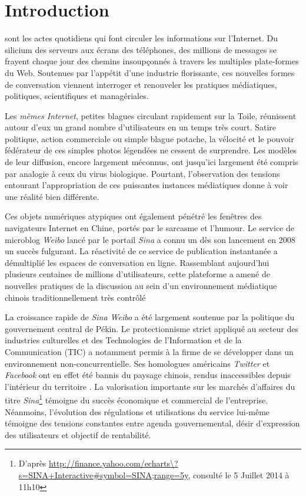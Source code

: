 \chapter*{Introduction}


 sont les actes quotidiens qui font circuler les informations sur l'Internet. Du silicium des serveurs aux écrans des téléphones, des millions de messages se frayent chaque jour des chemins insoupçonnés à travers les multiples plate-formes du Web. Soutenues par l'appétit d'une industrie florissante, ces nouvelles formes de conversation viennent interroger et renouveler les pratiques médiatiques, politiques, scientifiques et managériales.

Les \textit{mèmes Internet}, petites blagues circulant rapidement sur la Toile, réunissent autour d'eux un grand nombre d'utilisateurs en un temps très court. Satire politique, action commerciale ou simple blague potache, la vélocité et le pouvoir fédérateur de ces simples photos légendées ne cessent de surprendre. Les modèles de leur diffusion, encore largement méconnus, ont jusqu'ici largement été compris par analogie à ceux du virus biologique. Pourtant, l'observation des tensions entourant l'appropriation de ces puissantes instances médiatiques donne à voir une réalité bien différente.

Ces objets numériques atypiques ont également pénétré les fenêtres des navigateurs Internet en Chine, portés par le sarcasme et l'humour. Le service de microblog \textit{Weibo} lancé par le portail \textit{Sina} a connu un dès son lancement en 2008 un succès fulgurant. La réactivité de ce service de publication instantanée a démultiplié les espaces de conversation en ligne. Rassemblant aujourd'hui plusieurs centaines de millions d'utilisateurs, cette plateforme a amené de nouvelles pratiques de la discussion au sein d'un environnement médiatique chinois traditionnellement très contrôlé \citep{MacKinnon2009, Douzet2007, Yang2008}

La croissance rapide de \textit{Sina Weibo} a été largement soutenue par la politique du gouvernement central de Pékin. Le protectionnisme strict appliqué au secteur des industries culturelles et des Technologies de l'Information et de la Communication (TIC) a notamment permis à la firme de se développer dans un environnement non-concurrentielle. Ses homologues américains \textit{Twitter} et \textit{Facebook} ont en effet été bannis du paysage chinois, rendus inaccessibles depuis l'intérieur du territoire \citep{Sullivan2012}. La valorisation importante sur les marchés d'affaires du titre \textit{Sina}\footnote{D'après \url{http://finance.yahoo.com/echarts\?s=SINA+Interactive\#symbol=SINA;range=5y}, consulté le 5 Juillet 2014 à 11h10} témoigne du succès économique et commercial de l'entreprise. Néanmoins, l'évolution des régulations et utilisations du service lui-même témoigne des tensions constantes entre agenda gouvernemental, désir d'expression des utilisateurs et objectif de rentabilité.


